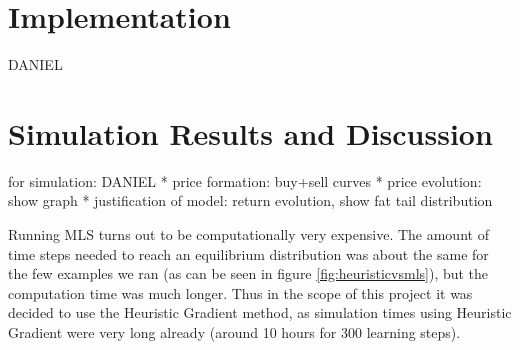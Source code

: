 \documentclass[11pt]{article}
\begin{document}
\section{Implementation}
DANIEL

\section{Simulation Results and Discussion}
for simulation: DANIEL
* price formation: buy+sell curves
* price evolution: show graph
* justification of model: return evolution, show fat tail distribution

Running MLS turns out to be computationally very expensive. The amount of time steps needed to reach an equilibrium distribution was about the same for the few examples we ran (as can be seen in figure \ref{fig:heuristicvsmls}), but the computation time was much longer. Thus in the scope of this project it was decided to use the Heuristic Gradient method, as simulation times using Heuristic Gradient were very long already (around 10 hours for 300 learning steps). \\
\end{document}
